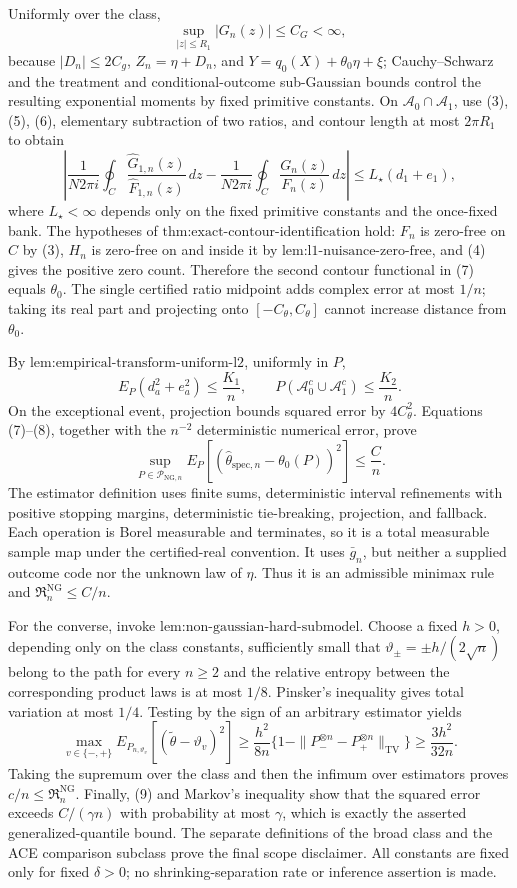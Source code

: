Uniformly over the class,
\[
 \sup_{|z|\le R_1}|G_n(z)|\le C_G<\infty, \tag{6}
\]
because \(|D_n|\le2C_g\), \(Z_n=\eta+D_n\), and
\(Y=q_0(X)+\theta_0\eta+\xi\); Cauchy--Schwarz and the treatment and conditional-outcome sub-Gaussian bounds control the resulting exponential moments by fixed primitive constants.  On \(\mathcal A_0\cap\mathcal A_1\), use (3), (5), (6), elementary subtraction of two ratios, and contour length at most \(2\pi R_1\) to obtain
\[
 \left|
 \frac{1}{N2\pi i}\oint_C
 \frac{\widehat G_{1,n}(z)}{\widehat F_{1,n}(z)}\,dz
 -
 \frac{1}{N2\pi i}\oint_C
 \frac{G_n(z)}{F_n(z)}\,dz
 \right|
 \le L_{\star}(d_1+e_1), \tag{7}
\]
where \(L_{\star}<\infty\) depends only on the fixed primitive constants and the once-fixed bank.  The hypotheses of \(\text{thm:exact-contour-identification}\) hold: \(F_n\) is zero-free on \(C\) by (3), \(H_n\) is zero-free on and inside it by \(\text{lem:l1-nuisance-zero-free}\), and (4) gives the positive zero count.  Therefore the second contour functional in (7) equals \(\theta_0\).  The single certified ratio midpoint adds complex error at most \(1/n\); taking its real part and projecting onto \([-C_{\theta},C_{\theta}]\) cannot increase distance from \(\theta_0\).

By \(\text{lem:empirical-transform-uniform-l2}\), uniformly in \(P\),
\[
 E_P(d_a^2+e_a^2)\le\frac{K_1}{n},
 \qquad
 P(\mathcal A_0^c\cup\mathcal A_1^c)\le\frac{K_2}{n}. \tag{8}
\]
On the exceptional event, projection bounds squared error by \(4C_{\theta}^2\).  Equations (7)--(8), together with the \(n^{-2}\) deterministic numerical error, prove
\[
 \sup_{P\in\mathcal P_{\mathrm{NG},n}}
 E_P[(\widehat\theta_{\mathrm{spec},n}-\theta_0(P))^2]
 \le\frac Cn. \tag{9}
\]
The estimator definition uses finite sums, deterministic interval refinements with positive stopping margins, deterministic tie-breaking, projection, and fallback.  Each operation is Borel measurable and terminates, so it is a total measurable sample map under the certified-real convention.  It uses \(\bar g_n\), but neither a supplied outcome code nor the unknown law of \(\eta\).  Thus it is an admissible minimax rule and \(\mathfrak R_n^{\mathrm{NG}}\le C/n\).

For the converse, invoke \(\text{lem:non-gaussian-hard-submodel}\).  Choose a fixed \(h>0\), depending only on the class constants, sufficiently small that \(\vartheta_{\pm}=\pm h/(2\sqrt n)\) belong to the path for every \(n\ge2\) and the relative entropy between the corresponding product laws is at most \(1/8\).  Pinsker's inequality gives total variation at most \(1/4\).  Testing by the sign of an arbitrary estimator yields
\[
 \max_{v\in\{-,+\}}E_{P_{n,\vartheta_v}}
 [ (\widetilde\theta-\vartheta_v)^2]
 \ge\frac{h^2}{8n}
 \{1-\|P_-^{\otimes n}-P_+^{\otimes n}\|_{\mathrm{TV}}\}
 \ge\frac{3h^2}{32n}.
\]
Taking the supremum over the class and then the infimum over estimators proves \(c/n\le\mathfrak R_n^{\mathrm{NG}}\).  Finally, (9) and Markov's inequality show that the squared error exceeds \(C/(\gamma n)\) with probability at most \(\gamma\), which is exactly the asserted generalized-quantile bound.  The separate definitions of the broad class and the ACE comparison subclass prove the final scope disclaimer.  All constants are fixed only for fixed \(\delta>0\); no shrinking-separation rate or inference assertion is made.